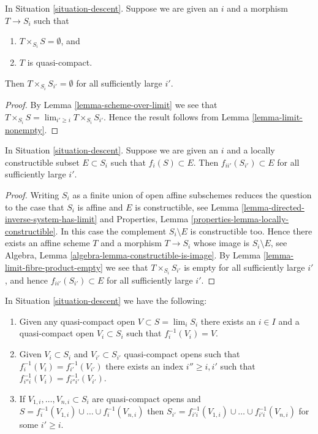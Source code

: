 \begin{lemma}
\label{lemma-limit-fibre-product-empty}
In Situation \ref{situation-descent}.
Suppose we are given an $i$ and a morphism $T \to S_i$ such that
\begin{enumerate}
\item $T \times_{S_i} S = \emptyset$, and
\item $T$ is quasi-compact.
\end{enumerate}
Then $T \times_{S_i} S_{i'} = \emptyset$ for all sufficiently large $i'$.
\end{lemma}

\begin{proof}
By Lemma \ref{lemma-scheme-over-limit}
we see that $T \times_{S_i} S = \lim_{i' \geq i} T \times_{S_i} S_{i'}$.
Hence the result follows from
Lemma \ref{lemma-limit-nonempty}.
\end{proof}

\begin{lemma}
\label{lemma-limit-contained-in-constructible}
In Situation \ref{situation-descent}.
Suppose we are given an $i$ and a locally constructible subset
$E \subset S_i$ such that $f_i(S) \subset E$.
Then $f_{ii'}(S_{i'}) \subset E$ for all sufficiently large $i'$.
\end{lemma}

\begin{proof}
Writing $S_i$ as a finite union of open affine subschemes reduces
the question to the case that $S_i$ is affine and $E$ is constructible, see
Lemma \ref{lemma-directed-inverse-system-has-limit}
and
Properties, Lemma \ref{properties-lemma-locally-constructible}.
In this case the complement $S_i \setminus E$ is constructible too.
Hence there exists an affine scheme $T$ and a morphism $T \to S_i$
whose image is $S_i \setminus E$, see
Algebra, Lemma \ref{algebra-lemma-constructible-is-image}.
By
Lemma \ref{lemma-limit-fibre-product-empty}
we see that $T \times_{S_i} S_{i'}$ is empty for all sufficiently large
$i'$, and hence $f_{ii'}(S_{i'}) \subset E$ for all sufficiently large $i'$.
\end{proof}

\begin{lemma}
\label{lemma-descend-opens}
In Situation \ref{situation-descent} we have the following:
\begin{enumerate}
\item Given any quasi-compact open $V \subset S = \lim_i S_i$
there exists an $i \in I$ and a quasi-compact open $V_i \subset S_i$
such that $f_i^{-1}(V_i) = V$.
\item Given $V_i \subset S_i$ and $V_{i'} \subset S_{i'}$
quasi-compact opens such that $f_i^{-1}(V_i) = f_{i'}^{-1}(V_{i'})$
there exists an index $i'' \geq i, i'$ such that
$f_{i''i}^{-1}(V_i) = f_{i''i'}^{-1}(V_{i'})$.
\item If $V_{1, i}, \ldots, V_{n, i} \subset S_i$ are quasi-compact
opens and $S = f_i^{-1}(V_{1, i}) \cup \ldots \cup f_i^{-1}(V_{n, i})$
then $S_{i'} = f_{i'i}^{-1}(V_{1, i}) \cup \ldots \cup f_{i'i}^{-1}(V_{n, i})$
for some $i' \geq i$.
\end{enumerate}
\end{lemma}

